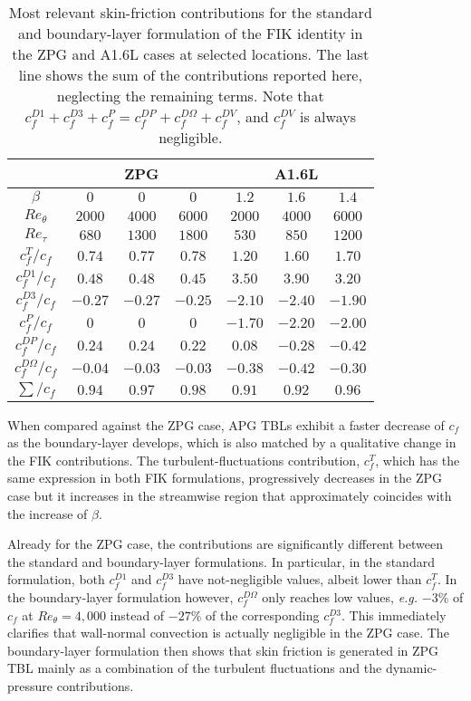 \begin{table}
\caption{\label{tab:contributionsFP} Most relevant skin-friction contributions for the standard and boundary-layer formulation of the FIK identity in the ZPG and A1.6L cases at selected locations. The last line shows the sum of the contributions reported here, neglecting the remaining terms. Note that $c^{D1}_f+c^{D3}_f+c^{P}_f=c^{DP}_f+c^{D\Omega}_f+c^{DV}_f$, and $c^{DV}_f$ is always negligible.}
\centering
\begin{tabular}{ccccccc}
\hline \hline
 &\multicolumn{3}{c}{ZPG}&\multicolumn{3}{c}{A1.6L}\\ \hline
$\beta$ & $0$ & $0$ & $0$ & $1.2$ & $1.6$ & $1.4$ \\
$Re_\theta$ & $2000$ & $4000$ & $6000$ & $2000$ & $4000$ & $6000$ \\
$Re_\tau$ & $680$ & $1300$ & $1800$ & $530$ & $850$ & $1200$ \\ \hline
$c^T_f/c_f$ & $\bm{0.74}$ & $\bm{0.77}$ & $\bm{0.78}$ & $1.20$ & $1.60$ & $1.70$ \\ \hline
$c^{D1}_f/c_f$ & $0.48$ & $0.48$ & $0.45$ & $\bm{3.50}$ & $\bm{3.90}$ & $\bm{3.20}$ \\
$c^{D3}_f/c_f$ & $-0.27$ & $-0.27$ & $-0.25$ & $-2.10$ & $-2.40$ & $-1.90$ \\
$c^{P}_f/c_f$ & $0$ & $0$ & $0$ & $-1.70$ & $-2.20$ & $-2.00$ \\ \hline
$c^{DP}_f/c_f$ & $0.24$ & $0.24$ & $0.22$ & $0.08$ & $-0.28$ & $-0.42$ \\
$c^{D\Omega}_f/c_f$ & $-0.04$ & $-0.03$ & $-0.03$ & $-0.38$ & $-0.42$ & $-0.30$ \\ \hline
$\sum/c_f$ & $0.94$ & $0.97$ & $0.98$ & $0.91$ & $0.92$ & $0.96$  \\
\hline \hline
\end{tabular}
%  
\end{table}


When compared against the ZPG case, APG TBLs exhibit a faster decrease of $c_f$ as the boundary-layer develops, which is also matched by a qualitative change in the FIK contributions. The turbulent-fluctuations contribution, $c^T_f$, which has the same expression in both FIK formulations, progressively decreases in the ZPG case but it increases in the streamwise region that approximately coincides with the increase of $\beta$. 


Already for the ZPG case, the contributions are significantly different between the standard and boundary-layer formulations. In particular, in the standard formulation, both $c^{D1}_f$ and $c^{D3}_f$ have not-negligible values, albeit lower than $c^T_f$. In the boundary-layer formulation however, $c^{D\Omega}_f$ only reaches low values, \textit{e.g.\!} $-3\%$ of $c_f$ at $Re_\theta=4,000$ instead of $-27\%$ of the corresponding $c^{D3}_f$. This immediately clarifies that wall-normal convection is actually negligible in the ZPG case. The boundary-layer formulation then shows that skin friction is generated in ZPG TBL mainly as a combination of the turbulent fluctuations and the dynamic-pressure contributions.


